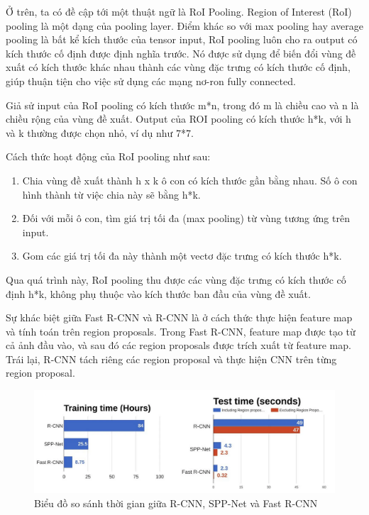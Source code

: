 Ở trên, ta có đề cập tới một thuật ngữ là RoI Pooling. Region of Interest (RoI) pooling là một dạng của pooling layer. Điểm khác so với max pooling hay average pooling là bất kể kích thước của tensor input, RoI pooling luôn cho ra output có kích thước cố định được định nghĩa trước. Nó được sử dụng để biến đổi vùng đề xuất có kích thước khác nhau thành các vùng đặc trưng có kích thước cố định, giúp thuận tiện cho việc sử dụng các mạng nơ-ron fully connected.

Giả sử input của RoI pooling có kích thước m*n, trong đó m là chiều cao và n là chiều rộng của vùng đề xuất. Output của ROI pooling có kích thước h*k, với h và k thường được chọn nhỏ, ví dụ như 7*7.

Cách thức hoạt động của RoI pooling như sau:
\begin{enumerate}[topsep=0pt,itemsep=-1ex,partopsep=1ex,parsep=1ex]
    \item Chia vùng đề xuất thành h x k ô con có kích thước gần bằng nhau. Số ô con hình thành từ việc chia này sẽ bằng h*k.
    \item Đối với mỗi ô con, tìm giá trị tối đa (max pooling) từ vùng tương ứng trên input.
    \item Gom các giá trị tối đa này thành một vectơ đặc trưng có kích thước h*k.
\end{enumerate}

Qua quá trình này, RoI pooling thu được các vùng đặc trưng có kích thước cố định h*k, không phụ thuộc vào kích thước ban đầu của vùng đề xuất.

Sự khác biệt giữa Fast R-CNN và R-CNN là ở cách thức thực hiện feature map và tính toán trên region proposals. Trong Fast R-CNN, feature map được tạo từ cả ảnh đầu vào, và sau đó các region proposals được trích xuất từ feature map. Trái lại, R-CNN tách riêng các region proposal và thực hiện CNN trên từng region proposal.

\graphicspath{{figures/}}
\begin{figure}[h!]
  \centering
  \includegraphics[scale=0.3]{graphics/Fast R-CNN compare.png}
  \caption{Biểu đồ so sánh thời gian giữa R-CNN, SPP-Net và Fast R-CNN \cite{compare}}
\end{figure}


